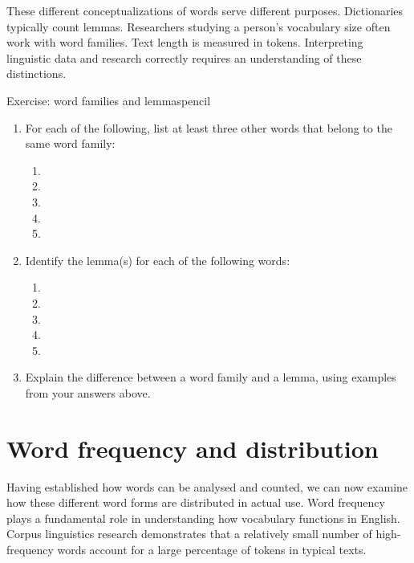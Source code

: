 These different conceptualizations of words serve different purposes. Dictionaries typically count lemmas. Researchers studying a person's vocabulary size often work with word families. Text length is measured in tokens. Interpreting linguistic data and research correctly requires an understanding of these distinctions.

\begin{tblsframedsymbol}{Exercise: word families and lemmas}{pencil}
\begin{enumerate}[noitemsep, leftmargin=*]
    \item For each of the following, list at least three other words that belong to the same word family:
    \begin{enumerate}[nosep]
        \item {}
        \item {}
        \item {}
        \item {}
        \item {}
    \end{enumerate}

    \item Identify the lemma(s) for each of the following words:
    \begin{enumerate}[nosep]
        \item {}
        \item {}
        \item {}
        \item {}
        \item {}
    \end{enumerate}

    \item Explain the difference between a word family and a lemma, using examples from your answers above.
\end{enumerate}
\end{tblsframedsymbol}

\section{Word frequency and distribution} \label{sec:word-frequency}

Having established how words can be analysed and counted, we can now examine how these different word forms are distributed in actual use. Word frequency plays a fundamental role in understanding how vocabulary functions in English. Corpus linguistics research demonstrates that a relatively small number of high-frequency words account for a large percentage of tokens in typical texts.

